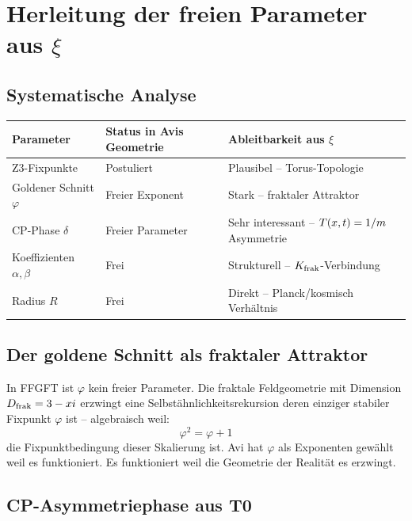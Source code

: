 \section{Herleitung der freien Parameter aus $\xi$}

\subsection{Systematische Analyse}

\begin{center}
\begin{tabular}{@{}lll@{}}
\toprule
Parameter & Status in Avis Geometrie & Ableitbarkeit aus $\xi$ \\
\midrule
Z3-Fixpunkte & Postuliert & Plausibel -- Torus-Topologie \\
Goldener Schnitt $\varphi$ & Freier Exponent & Stark -- fraktaler Attraktor \\
CP-Phase $\delta$ & Freier Parameter & Sehr interessant -- $T(x,t) = 1/m$ Asymmetrie \\
Koeffizienten $\alpha, \beta$ & Frei & Strukturell -- $K_{\text{frak}}$-Verbindung \\
Radius $R$ & Frei & Direkt -- Planck/kosmisch Verhältnis \\
\bottomrule
\end{tabular}
\end{center}

\subsection{Der goldene Schnitt als fraktaler Attraktor}

In FFGFT ist $\varphi$ kein freier Parameter. Die fraktale Feldgeometrie mit Dimension $D_{\text{frak}} = 3 - xi$ erzwingt eine Selbstähnlichkeitsrekursion deren einziger stabiler Fixpunkt $\varphi$ ist -- algebraisch weil:
\begin{equation}
  \varphi^2 = \varphi + 1
\end{equation}
die Fixpunktbedingung dieser Skalierung ist. Avi hat $\varphi$ als Exponenten gewählt weil es funktioniert. Es funktioniert weil die Geometrie der Realität es erzwingt.

\subsection{CP-Asymmetriephase aus T0}

